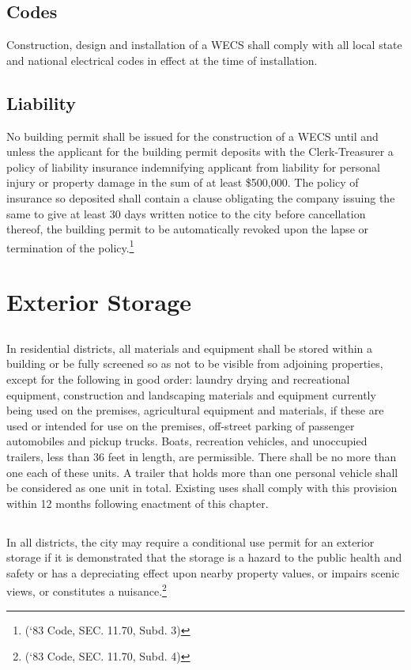\subsection{Codes}
Construction, design and installation of a WECS shall comply with all local state and national electrical codes in effect at the time of installation.
\subsection{Liability}
No building permit shall be issued for the construction of a WECS until and unless the applicant for the building permit deposits with the Clerk-Treasurer a policy of liability insurance indemnifying applicant from liability for personal injury or property damage in the sum of at least \$500,000. The policy of insurance so deposited shall contain a clause obligating the company issuing the same to give at least 30 days written notice to the city before cancellation thereof, the building permit to be automatically revoked upon the lapse or termination of the policy.\footnote{(‘83 Code, SEC. 11.70, Subd. 3)}
\section{Exterior Storage}
\subsection{}
In residential districts, all materials and equipment shall be stored within a building or be fully screened so as not to be visible from adjoining properties, except for the following in good order: laundry drying and recreational equipment, construction and landscaping materials and equipment currently being used on the premises, agricultural equipment and materials, if these are used or intended for use on the premises, off-street parking of passenger automobiles and pickup trucks. Boats, recreation vehicles, and unoccupied trailers, less than 36 feet in length, are permissible. There shall be no more than one each of these units. A trailer that holds more than one personal vehicle shall be considered as one unit in total.  Existing uses shall comply with this provision within 12 months following enactment of this chapter.
\subsection{}
In all districts, the city may require a conditional use permit for an exterior storage if it is demonstrated that the storage is a hazard to the public health and safety or has a depreciating effect upon nearby property values, or impairs scenic views, or constitutes a nuisance.\footnote{(‘83 Code, SEC. 11.70, Subd. 4)}
